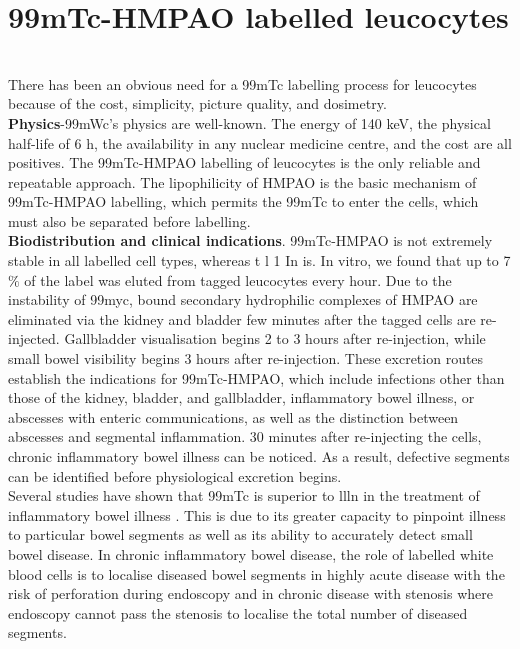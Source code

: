 \documentclass[12pt]{article}
\begin{document}
\section{99mTc-HMPAO labelled leucocytes}
\\There has been an obvious need for a 99mTc labelling process for leucocytes because of the cost, simplicity, picture quality, and dosimetry.
\\\textbf{Physics}-99mWc's physics are well-known. The energy of 140 keV, the physical half-life of 6 h, the availability in any nuclear medicine centre, and the cost are all positives. The 99mTc-HMPAO labelling of leucocytes is the only reliable and repeatable approach. The lipophilicity of HMPAO is the basic mechanism of 99mTc-HMPAO labelling, which permits the 99mTc to enter the cells, which must also be separated before labelling.
\\\textbf{Biodistribution and clinical indications}. 99mTc-HMPAO is not extremely stable in all labelled cell types, whereas t l 1 In is. In vitro, we found that up to 7$\%$ of the label was eluted from tagged leucocytes every hour. Due to the instability of 99myc, bound secondary hydrophilic complexes of HMPAO are eliminated via the kidney and bladder few minutes after the tagged cells are re-injected. Gallbladder visualisation begins 2 to 3 hours after re-injection, while small bowel visibility begins 3 hours after re-injection. These excretion routes establish the indications for 99mTc-HMPAO, which include infections other than those of the kidney, bladder, and gallbladder, inflammatory bowel illness, or abscesses with enteric communications, as well as the distinction between abscesses and segmental inflammation. 30 minutes after re-injecting the cells, chronic inflammatory bowel illness can be noticed. As a result, defective segments can be identified before physiological excretion begins.
\\Several studies have shown that 99mTc is superior to llln in the treatment of inflammatory bowel illness . This is due to its greater capacity to pinpoint illness to particular bowel segments as well as its ability to accurately detect small bowel disease. In chronic inflammatory bowel disease, the role of labelled white blood cells is to localise diseased bowel segments in highly acute disease with the risk of perforation during endoscopy and in chronic disease with stenosis where endoscopy cannot pass the stenosis to localise the total number of diseased segments.
\end{document}
